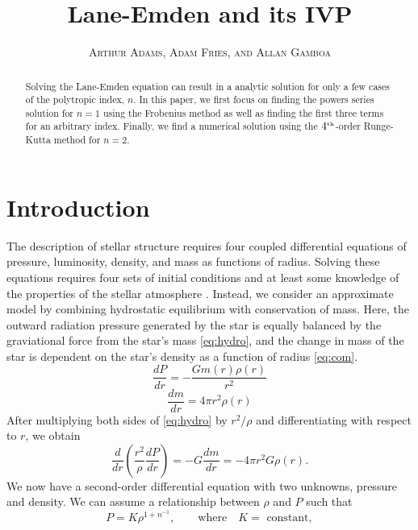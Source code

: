 \documentclass[12pt, manuscript]{article}
\title{Lane-Emden and its IVP}
\author{\small{\textsc{Arthur Adams, Adam Fries, and Allan Gamboa}}}
\affil{San Francisco State University \\ Department of Physics and Astronomy}
\begin{document}
\maketitle
    \begin{abstract}
        Solving the Lane-Emden equation can result in a analytic solution for only a few cases of the polytropic index, $n$. In this paper, we first focus on finding the powers series solution for $n = 1$ using the Frobenius method as well as finding the first three terms for an arbitrary index. Finally, we find a numerical solution using the $4^{\text{\tiny{th}}}$-order Runge-Kutta method for $n = 2$.  
    \end{abstract}
    
    \section*{Introduction}
        The description of stellar structure requires four coupled differential equations of pressure, luminosity, density, and mass as functions of radius. Solving these equations requires four sets of initial conditions and at least some knowledge of the properties of the stellar atmosphere \cite{ac}. Instead, we consider an approximate model by combining hydrostatic equilibrium with conservation of mass. Here, the outward radiation pressure generated by the star is equally balanced by the graviational force from the star's mass \eqref{eq:hydro}, and the change in mass of the star is dependent on the star's density as a function of radius \eqref{eq:com}.
        \begin{equation}\label{eq:hydro}
            \frac{dP}{dr} = -\frac{Gm(r)\rho(r)}{r^2}
        \end{equation}   
        \begin{equation}\label{eq:com}
            \frac{dm}{dr} = 4\pi r^2\rho(r)
        \end{equation}
    After multiplying both sides of \eqref{eq:hydro} by $r^2/\rho$ and differentiating with respect to $r$, we obtain
        \begin{equation}\label{eq:hydro2}
            \frac{d}{dr}\left(\frac{r^2}{\rho}\frac{dP}{dr}\right) = -G\frac{dm}{dr} = -4\pi r^2G\rho(r).
        \end{equation}
        We now have a second-order differential equation with two unknowns, pressure and density. We can assume a relationship between $\rho$ and $P$ such that
        \begin{equation}\label{eq:poly}
            P = K\rho^{1 + n^{-1}}, \qquad \text{where} \quad K = \text{ constant},
        \end{equation}
\end{document}
